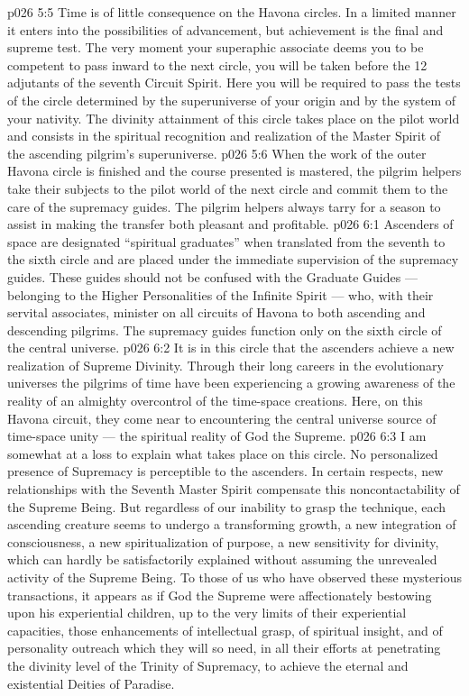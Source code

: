 \vs p026 5:5 Time is of little consequence on the Havona circles. In a limited manner it enters into the possibilities of advancement, but achievement is the final and supreme test. The very moment your superaphic associate deems you to be competent to pass inward to the next circle, you will be taken before the 12 adjutants of the seventh Circuit Spirit. Here you will be required to pass the tests of the circle determined by the superuniverse of your origin and by the system of your nativity. The divinity attainment of this circle takes place on the pilot world and consists in the spiritual recognition and realization of the Master Spirit of the ascending pilgrim’s superuniverse.
\vs p026 5:6 When the work of the outer Havona circle is finished and the course presented is mastered, the pilgrim helpers take their subjects to the pilot world of the next circle and commit them to the care of the supremacy guides. The pilgrim helpers always tarry for a season to assist in making the transfer both pleasant and profitable.
\vs p026 6:1 Ascenders of space are designated “spiritual graduates” when translated from the seventh to the sixth circle and are placed under the immediate supervision of the supremacy guides. These guides should not be confused with the Graduate Guides --- belonging to the Higher Personalities of the Infinite Spirit --- who, with their servital associates, minister on all circuits of Havona to both ascending and descending pilgrims. The supremacy guides function only on the sixth circle of the central universe.
\vs p026 6:2 It is in this circle that the ascenders achieve a new realization of Supreme Divinity. Through their long careers in the evolutionary universes the pilgrims of time have been experiencing a growing awareness of the reality of an almighty overcontrol of the time\hyp{}space creations. Here, on this Havona circuit, they come near to encountering the central universe source of time\hyp{}space unity --- the spiritual reality of God the Supreme.
\vs p026 6:3 I am somewhat at a loss to explain what takes place on this circle. No personalized presence of Supremacy is perceptible to the ascenders. In certain respects, new relationships with the Seventh Master Spirit compensate this noncontactability of the Supreme Being. But regardless of our inability to grasp the technique, each ascending creature seems to undergo a transforming growth, a new integration of consciousness, a new spiritualization of purpose, a new sensitivity for divinity, which can hardly be satisfactorily explained without assuming the unrevealed activity of the Supreme Being. To those of us who have observed these mysterious transactions, it appears as if God the Supreme were affectionately bestowing upon his experiential children, up to the very limits of their experiential capacities, those enhancements of intellectual grasp, of spiritual insight, and of personality outreach which they will so need, in all their efforts at penetrating the divinity level of the Trinity of Supremacy, to achieve the eternal and existential Deities of Paradise.
